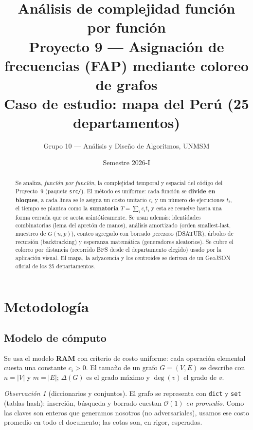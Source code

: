 \documentclass[11pt,a4paper]{article}
\title{\textbf{Análisis de complejidad función por función}\\[2mm]
\large Proyecto 9 --- Asignación de frecuencias (FAP) mediante coloreo de grafos\\
Caso de estudio: mapa del Perú (25 departamentos)}
\author{Grupo 10 --- Análisis y Diseño de Algoritmos, UNMSM}
\date{Semestre 2026-I}
\theoremstyle{definition}
\theoremstyle{remark}
\newtheorem{observacion}[teorema]{Observación}
\newcommand{\dg}{\operatorname{deg}}
\newcommand{\bigO}{\mathcal{O}}
\begin{document}
\maketitle

\begin{abstract}
Se analiza, \emph{función por función}, la complejidad temporal y espacial del
código del Proyecto~9 (paquete \texttt{src/}). El método es uniforme: cada
función se \textbf{divide en bloques}, a cada línea se le asigna un costo
unitario $c_i$ y un número de ejecuciones $t_i$, el tiempo se plantea como la
\textbf{sumatoria} $T=\sum_i c_i t_i$ y esta se resuelve hasta una forma cerrada
que se acota asintóticamente. Se usan además: identidades combinatorias (lema
del apretón de manos), análisis amortizado (orden smallest-last, muestreo de
$G(n,p)$), conteo agregado con borrado perezoso (DSATUR), árboles de recursión
(backtracking) y esperanza matemática (generadores aleatorios). Se cubre el
coloreo por distancia (recorrido BFS desde el departamento elegido) usado por la
aplicación visual. El mapa, la adyacencia y los centroides se derivan de un
GeoJSON oficial de los 25 departamentos.
\end{abstract}

\tableofcontents
\newpage

\section{Metodología}\label{sec:metodo}

\subsection{Modelo de cómputo}
Se usa el modelo \textbf{RAM} con criterio de costo uniforme: cada operación
elemental cuesta una constante $c_i>0$. El tamaño de un grafo $G=(V,E)$ se
describe con $n=|V|$ y $m=|E|$; $\Delta(G)$ es el grado máximo y $\dg(v)$ el
grado de $v$.

\begin{observacion}[diccionarios y conjuntos]\label{obs:hash}
El grafo se representa con \texttt{dict} y \texttt{set} (tablas hash): inserción,
búsqueda y borrado cuestan $\bigO(1)$ \emph{en promedio}. Como las claves son
enteros que generamos nosotros (no adversariales), usamos ese costo promedio en
todo el documento; las cotas son, en rigor, esperadas.
\end{observacion}
\end{document}
